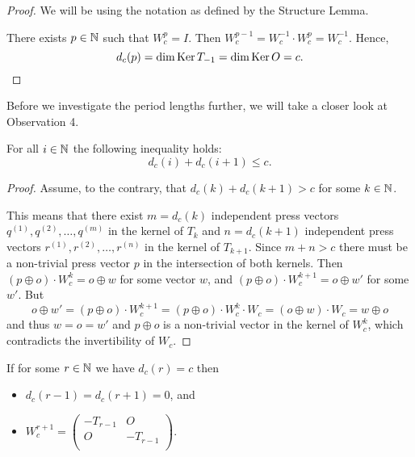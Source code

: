 \begin{proof}
  We will be using the notation as defined by the Structure Lemma.

  There exists $p\in\mathbb{N}$ such that $W_{c}^{p} = I$.
  Then $W_{c}^{p-1} = W_{c}^{-1} \cdot W_{c}^{p} = W_{c}^{-1}$.
  Hence,
  \[
  d_{c}(p)
  =
  \dim\operatorname{Ker} T_{-1}
  =
  \dim\operatorname{Ker} O
  = c.
  \]
\end{proof}
Before we investigate the period lengths further,
we will take a closer look at Observation 4.

\begin{theorem}[Observation 4]\label{thm:consec}
  For all $i\in\mathbb{N}$ the following inequality holds:
  \[d_{c}(i) + d_{c}(i+1) \leq c.\]
\end{theorem}
\begin{proof}
  Assume, to the contrary, that $d_{c}(k) + d_{c}(k+1) > c$ for some $k\in\mathbb{N}$.

  This means that there exist $m=d_{c}(k)$ independent press vectors
  $q^{(1)}, q^{(2)}, \ldots, q^{(m)}$ in the kernel of $T_k$ and
  $n = d_{c}(k+1)$ independent press vectors
  $r^{(1)}, r^{(2)}, \ldots, r^{(n)}$ in the kernel of $T_{k+1}$.
  Since $m+n>c$ there must be a non-trivial press vector $p$ in the intersection
  of both kernels. Then $(p\oplus o)\cdot W_c^{k} = o\oplus w$ for
  some vector $w$, and $(p\oplus o)\cdot W_c^{k+1}=o\oplus w'$ for some $w'$.
  But 
  \[ o\oplus w'=(p\oplus o)\cdot W_c^{k+1}=(p\oplus o)\cdot W_c^{k}\cdot W_c=(o\oplus w)\cdot W_c=
   w\oplus o\]
  and thus $w=o=w'$ and $p\oplus o$ is a non-trivial vector in the kernel
  of $W_c^k$, which contradicts the invertibility of $W_c$.
\end{proof}

\begin{corollary}\label{cor:max}
  If for some $r\in\mathbb{N}$ we have $d_{c}(r) = c$ then
  \begin{itemize}
    \item $d_{c}(r-1) = d_{c}(r+1) = 0$, and
    \item $W_{c}^{r+1} = \left(\begin{smallmatrix} -T_{r-1} & O \\
                                  O & -T_{r-1} \\\end{smallmatrix}\right)$.
  \end{itemize}
\end{corollary}

